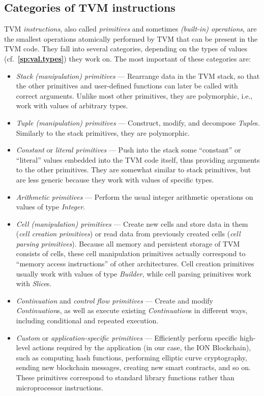 \documentclass[12pt,oneside]{article}
\def\refpoint#1{{\rm\textbf{\ref{#1}}}}
\let\ptref=\refpoint
\def\mysubsection#1{\subsection{#1}\fancyhead[C]{\small{\textsc{\textrm{\thesubsection.} #1}}}}
\begin{document}
\mysubsection{Categories of TVM instructions}
TVM {\em instructions}, also called {\em primitives\/} and sometimes {\em (built-in) operations}, are the smallest operations atomically performed by TVM that can be present in the TVM code. They fall into several categories, depending on the types of values (cf.~\ptref{sp:val.types}) they work on. The most important of these categories are:
\begin{itemize}
\item {\em Stack (manipulation) primitives\/} --- Rearrange data in the TVM stack, so that the other primitives and user-defined functions can later be called with correct arguments. Unlike most other primitives, they are polymorphic, i.e., work with values of arbitrary types.
\item {\em Tuple (manipulation) primitives\/} --- Construct, modify, and decompose {\em Tuple\/}s. Similarly to the stack primitives, they are polymorphic.
\item {\em Constant\/} or {\em literal primitives\/} --- Push into the stack some ``constant'' or ``literal'' values embedded into the TVM code itself, thus providing arguments to the other primitives. They are somewhat similar to stack primitives, but are less generic because they work with values of specific types.
\item {\em Arithmetic primitives\/} --- Perform the usual integer arithmetic operations on values of type {\em Integer}.
\item {\em Cell (manipulation) primitives\/} --- Create new cells and store data in them ({\em cell creation primitives}) or read data from previously created cells ({\em cell parsing primitives}). Because all memory and persistent storage of TVM consists of cells, these cell manipulation primitives actually correspond to ``memory access instructions'' of other architectures. Cell creation primitives usually work with values of type {\em Builder}, while cell parsing primitives work with {\em Slice\/}s.
\item {\em Continuation\/} and {\em control flow primitives\/} --- Create and modify {\em Continuation\/}s, as well as execute existing {\em Continuation\/}s in different ways, including conditional and repeated execution.
\item {\em Custom\/} or {\em application-specific primitives\/} --- Efficiently perform specific high-level actions required by the application (in our case, the ION Blockchain), such as computing hash functions, performing elliptic curve cryptography, sending new blockchain messages, creating new smart contracts, and so on. These primitives correspond to standard library functions rather than microprocessor instructions.
\end{itemize}
\end{document}
